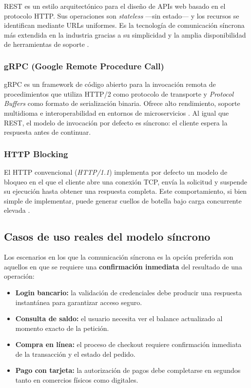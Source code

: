 \documentclass[12pt,a4paper]{article}
\begin{document}
REST es un estilo arquitectónico para el diseño de APIs web basado en el protocolo HTTP. Sus operaciones son \textit{stateless} —sin estado— y los recursos se identifican mediante URLs uniformes. Es la tecnología de comunicación síncrona más extendida en la industria gracias a su simplicidad y la amplia disponibilidad de herramientas de soporte \cite{ref5}.
 
\subsubsection{gRPC (Google Remote Procedure Call)}
 
gRPC es un framework de código abierto para la invocación remota de procedimientos que utiliza HTTP/2 como protocolo de transporte y \textit{Protocol Buffers} como formato de serialización binaria. Ofrece alto rendimiento, soporte multidioma e interoperabilidad en entornos de microservicios \cite{ref6}. Al igual que REST, el modelo de invocación por defecto es síncrono: el cliente espera la respuesta antes de continuar.
 
\subsubsection{HTTP Blocking}
 
El HTTP convencional (\textit{HTTP/1.1}) implementa por defecto un modelo de bloqueo en el que el cliente abre una conexión TCP, envía la solicitud y suspende su ejecución hasta obtener una respuesta completa. Este comportamiento, si bien simple de implementar, puede generar cuellos de botella bajo carga concurrente elevada \cite{ref7}.
 
\subsection{Casos de uso reales del modelo síncrono}
 
Los escenarios en los que la comunicación síncrona es la opción preferida son aquellos en que se requiere una \textbf{confirmación inmediata} del resultado de una operación:
 
\begin{itemize}
  \item \textbf{Login bancario:} la validación de credenciales debe producir una respuesta instantánea para garantizar acceso seguro.
  \item \textbf{Consulta de saldo:} el usuario necesita ver el balance actualizado al momento exacto de la petición.
  \item \textbf{Compra en línea:} el proceso de checkout requiere confirmación inmediata de la transacción y el estado del pedido.
  \item \textbf{Pago con tarjeta:} la autorización de pagos debe completarse en segundos tanto en comercios físicos como digitales.
\end{itemize}
 
\end{document}
